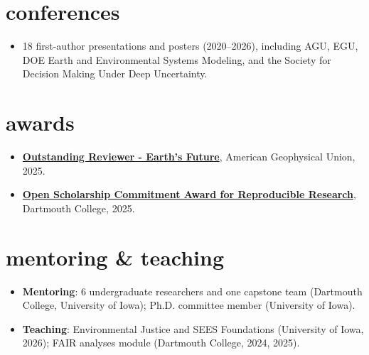 \documentclass[10pt,oneside]{article}
\begin{document}
\section{conferences}

\mbox{}\vspace{-\dimexpr\baselineskip\relax}

\begin{itemize}[label={}]

\item 18 first-author presentations and posters (2020--2026), including AGU, EGU, DOE Earth and Environmental Systems Modeling, and the Society for Decision Making Under Deep Uncertainty.

\end{itemize}

\section{awards}

\mbox{}\vspace{-\dimexpr\baselineskip\relax}

\begin{itemize}[label={}]

\item \href{https://www.agu.org/user-profile?cstkey=2aed905f-b819-4e8e-a70a-338d3932a001}{\textbf{Outstanding Reviewer - Earth's Future}}, American Geophysical Union, 2025.

\item \href{https://researchguides.dartmouth.edu/c.php?g=1435408&p=10819576#s-lg-box-35687611}{\textbf{Open Scholarship Commitment Award for Reproducible Research}}, Dartmouth College, 2025.

\end{itemize}

\section{mentoring \& teaching}

\mbox{}\vspace{-\dimexpr\baselineskip\relax}

\begin{itemize}[label={}]

\item \textbf{Mentoring}: 6 undergraduate researchers and one capstone team (Dartmouth College, University of Iowa); Ph.D. committee member (University of Iowa).

\item \textbf{Teaching}: Environmental Justice and SEES Foundations (University of Iowa, 2026); FAIR analyses module (Dartmouth College, 2024, 2025).

\end{itemize}
\end{document}
